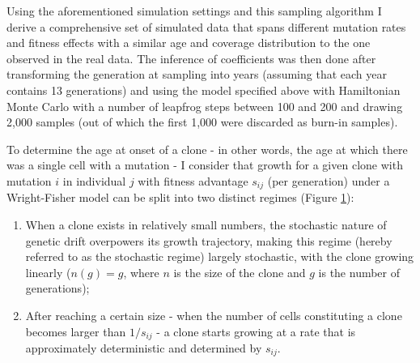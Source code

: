 Using the aforementioned simulation settings and this sampling algorithm I derive a comprehensive set of simulated data that spans different mutation rates and fitness effects with a similar age and coverage distribution to the one observed in the real data. The inference of coefficients was then done after transforming the generation at sampling into years (assuming that each year contains 13 generations) and using the model specified above with Hamiltonian Monte Carlo with a number of leapfrog steps between 100 and 200 and drawing 2,000 samples (out of which the first 1,000 were discarded as burn-in samples). 

To determine the age at onset of a clone - in other words, the age at which there was a single cell with a mutation - I consider that growth for a given clone with mutation $i$ in individual $j$ with fitness advantage $s_{ij}$ (per generation) under a Wright-Fisher model can be split into two distinct regimes (Figure \ref{fig:wf-example}):

\begin{enumerate}
    \item When a clone exists in relatively small numbers, the stochastic nature of genetic drift overpowers its growth trajectory, making this regime (hereby referred to as the stochastic regime) largely stochastic, with the clone growing linearly ($n(g) = g$, where $n$ is the size of the clone and $g$ is the number of generations);
    \item After reaching a certain size - when the number of cells constituting a clone becomes larger than $1/s_{ij}$ - a clone starts growing at a rate that is approximately deterministic and determined by $s_{ij}$.
\end{enumerate}

\begin{figure}
	\label{fig:wf-example}
\end{figure}


